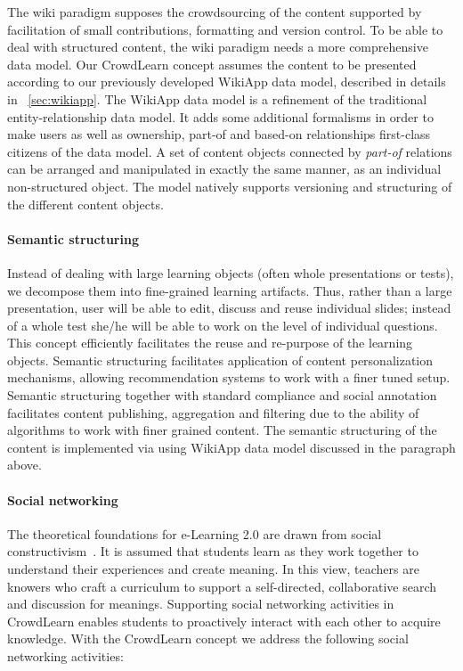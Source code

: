 \documentclass[ngerman,UKenglish,table]{scrbook}
\begin{document}
The wiki paradigm supposes the crowdsourcing of the content supported by facilitation of small contributions, formatting and version control.
To be able to deal with structured content, the wiki paradigm needs a more comprehensive data model.
Our CrowdLearn concept assumes the content to be presented according to our previously developed WikiApp data model, described in details in ~\autoref{sec:wikiapp}.
The WikiApp data model is a refinement of the traditional entity-relationship data model.
It adds some additional formalisms in order to make users as well as ownership, part-of and based-on relationships first-class citizens of the data model.
A set of content objects connected by \emph{part-of} relations can be arranged and manipulated in exactly the same manner, as an individual non-structured object.
The model natively supports versioning and structuring of the different content objects.

\paragraph{Semantic structuring}

Instead of dealing with large learning objects (often whole presentations or tests), we decompose them into fine-grained learning artifacts.
Thus, rather than a large presentation, user will be able to edit, discuss and reuse individual slides; instead of a whole test she/he will be able to work on the level of individual questions.
This concept efficiently facilitates the reuse and re-purpose of the learning objects.
Semantic structuring facilitates application of content personalization mechanisms, allowing recommendation systems to work with a finer tuned setup.
Semantic structuring together with standard compliance and social annotation facilitates content publishing, aggregation and filtering due to the ability of algorithms to work with finer grained content.
The semantic structuring of the content is implemented via using WikiApp data model discussed in the paragraph above.

\paragraph{Social networking}

The theoretical foundations for e-Learning 2.0 are drawn from social constructivism~\cite{Wang2012}.
It is assumed that students learn as they work together to understand their experiences and create meaning.
In this view, teachers are knowers who craft a curriculum to support a self-directed, collaborative search and discussion for meanings.
Supporting social networking activities in CrowdLearn enables students to proactively interact with each other to acquire knowledge.
With the CrowdLearn concept we address the following social networking activities: 
\end{document}
